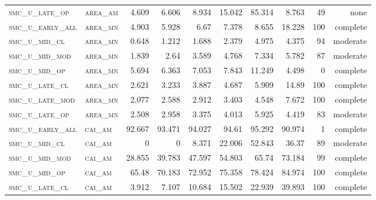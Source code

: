\begin{landscape}
\begin{center}
\begin{footnotesize}
\begin{longtable}{llrrrrr|rrr}
\textsc{smc\_u\_late\_op  } & \textsc{area\_am  }   & 4.609    & 6.606    & 8.934    & 15.042   & 85.314   & 8.763         & 49            & none        \\
\textsc{smc\_u\_early\_all} & \textsc{area\_mn  }   & 4.903    & 5.928    & 6.67     & 7.378    & 8.655    & 18.228        & 100           & complete        \\
\textsc{smc\_u\_mid\_cl   } & \textsc{area\_mn  }   & 0.648    & 1.212    & 1.688    & 2.379    & 4.975    & 4.375         & 94            & moderate        \\
\textsc{smc\_u\_mid\_mod  } & \textsc{area\_mn  }   & 1.839    & 2.64     & 3.589    & 4.768    & 7.334    & 5.782         & 87            & moderate        \\
\textsc{smc\_u\_mid\_op   } & \textsc{area\_mn  }   & 5.694    & 6.363    & 7.053    & 7.843    & 11.249   & 4.498         & 0             & complete            \\
\textsc{smc\_u\_late\_cl  } & \textsc{area\_mn  }   & 2.621    & 3.233    & 3.887    & 4.687    & 5.909    & 14.89         & 100           & complete        \\
\textsc{smc\_u\_late\_mod } & \textsc{area\_mn  }   & 2.077    & 2.588    & 2.912    & 3.403    & 4.548    & 7.672         & 100           & complete        \\
\textsc{smc\_u\_late\_op  } & \textsc{area\_mn  }   & 2.508    & 2.958    & 3.375    & 4.013    & 5.925    & 4.419         & 83            & moderate        \\
\textsc{smc\_u\_early\_all} & \textsc{cai\_am   }   & 92.667   & 93.471   & 94.027   & 94.61    & 95.292   & 90.974        & 1             & complete        \\
\textsc{smc\_u\_mid\_cl   } & \textsc{cai\_am   }   & 0        & 0        & 8.371    & 22.006   & 52.843   & 36.37         & 89            & moderate        \\
\textsc{smc\_u\_mid\_mod  } & \textsc{cai\_am   }   & 28.855   & 39.783   & 47.597   & 54.803   & 65.74    & 73.184        & 99            & complete        \\
\textsc{smc\_u\_mid\_op   } & \textsc{cai\_am   }   & 65.48    & 70.183   & 72.952   & 75.358   & 78.424   & 84.974        & 100           & complete        \\
\textsc{smc\_u\_late\_cl  } & \textsc{cai\_am   }   & 3.912    & 7.107    & 10.684   & 15.502   & 22.939   & 39.893        & 100           & complete        \\

\end{longtable}
\end{footnotesize}
\end{center}
\end{landscape}
